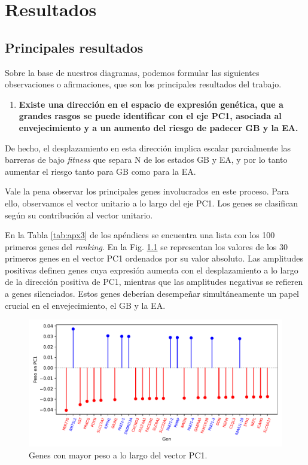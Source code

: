 \chapter{Resultados}
\label{cap3}
\onehalfspacing

\section{Principales resultados}

Sobre la base de nuestros diagramas, podemos formular las siguientes observaciones o afirmaciones, que son los principales resultados del trabajo.

\begin{enumerate}
	\item  \textbf{Existe una dirección en el espacio de expresión genética, que a grandes rasgos se puede identificar con el eje PC1, asociada al envejecimiento y a un aumento del riesgo de padecer GB y la EA.}
\end{enumerate}

De hecho, el desplazamiento en esta dirección implica escalar parcialmente las barreras de bajo \textit{fitness} que separa N de los estados GB y EA, y por lo tanto aumentar el riesgo tanto para GB como para la EA.

Vale la pena observar los principales genes involucrados en este proceso. Para ello, observamos el vector unitario a lo largo del eje PC1. Los genes se clasifican según su contribución al vector unitario.%

En la Tabla \ref{tab:apx3} de los apéndices se encuentra una lista con los 100 primeros genes del \textit{ranking}. En la Fig. \ref{fig:figpc1} se representan los valores de los 30 primeros genes en el vector PC1 ordenados por su valor absoluto. Las amplitudes positivas definen genes cuya expresión aumenta con el desplazamiento a lo largo de la dirección positiva de PC1, mientras que las amplitudes negativas se refieren a genes silenciados. Estos genes deberían desempeñar simultáneamente un papel crucial en el envejecimiento, el GB y la EA.

\begin{figure}[!htb]
	\centering
	\includegraphics[width=\linewidth]{figures/PC1}
	\caption{Genes con mayor peso a lo largo del vector PC1.}
	\label{fig:figpc1}
\end{figure}

